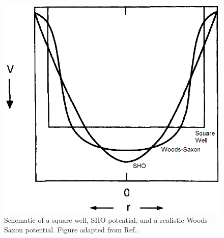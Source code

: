 \begin{figure}
\centerline{\includegraphics[height=0.25\textheight]{./img/c2/sho_approx.png}}
	\caption{Schematic of a square well, SHO potential, and a realistic Woods-Saxon potential. Figure adapted from Ref.\cite{casten}.\label{fig:chp2-SHOPot}}
\end{figure}

